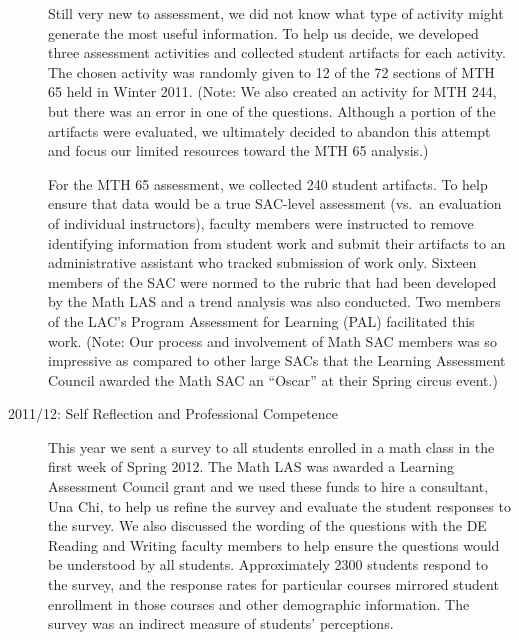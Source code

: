 \begin{description}
Still very new to assessment, we did not know what type of activity might generate the most useful information.  To help us decide, we developed three assessment activities and collected student artifacts for each activity.  The chosen activity was randomly given to 12 of the 72 sections of MTH 65 held in Winter 2011.  (Note: We also created an activity for MTH 244, but there was an error in one of the questions.  Although a portion of the artifacts were evaluated, we ultimately decided to abandon this attempt and focus our limited resources toward the MTH 65 analysis.)

For the MTH 65 assessment, we collected 240 student artifacts.  To help ensure that data would be a true SAC-level assessment (vs.\ an evaluation of individual instructors), faculty members were instructed to remove identifying information from student work and submit their artifacts to an administrative assistant who tracked submission of work only.  Sixteen members of the SAC were normed to the rubric that had been developed by the Math LAS and a trend analysis was also conducted.  Two members of the LAC's Program Assessment for Learning (PAL) facilitated this work.  (Note: Our process and involvement of Math SAC members was so impressive as compared to other large SACs that the Learning Assessment Council awarded the Math SAC an ``Oscar'' at their Spring circus event.)

\item[2011/12: Self Reflection and Professional Competence]

This year we sent a survey to all students enrolled in a math class in the first week of Spring 2012.  The Math LAS was awarded a Learning Assessment Council grant and we used these funds to hire a consultant, Una Chi, to help us refine the survey and evaluate the student responses to the survey.  We also discussed the wording of the questions with the DE Reading and Writing faculty members to help ensure the questions would be understood by all students. Approximately 2300 students respond to the survey, and the response rates for particular courses mirrored student enrollment in those courses and other demographic information.  The survey was an indirect measure of students' perceptions.  


\end{description}
